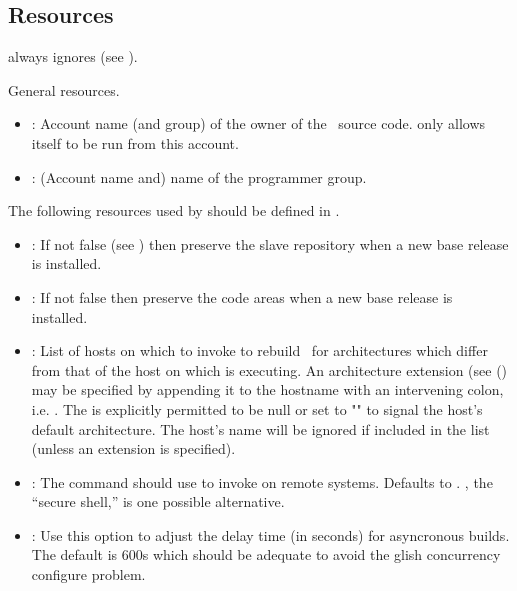 \subsection*{Resources}

 always ignores  (see ).

\noindent
General resources.

\begin{itemize}
\item
   : Account name (and group) of the owner of the
   \aipspp\ source code.   only allows itself to be run from this
   account.

\item
   : (Account name and) name of the \aipspp
   programmer group.
\end{itemize}

\noindent
The following resources used by  should be defined in
.

\begin{itemize}
\item
   : If not false (see ) then
   preserve the slave repository when a new base release is installed.

\item
   : If not false then preserve the code areas
   when a new base release is installed.

\item
   : List of hosts on which to invoke
    to rebuild \aipspp\ for architectures which differ from
   that of the host on which  is executing.  An architecture
   extension (see () may be specified by appending it to the
   hostname with an intervening colon, i.e. .
   The  is explicitly permitted to be null or set to
   "\code{\_}" to signal the host's default architecture.  The 
   host's name will be ignored if included in the list (unless an extension is
   specified).

\item
   : The command  should use
   to invoke  on remote systems.  Defaults to
   .  , the ``secure shell,'' is one possible
   alternative.

\item
   : Use this option to adjust the delay time (in seconds)
   for asyncronous builds.  The default is 600s which should be adequate to 
   avoid the glish concurrency configure problem.

\end{itemize}

